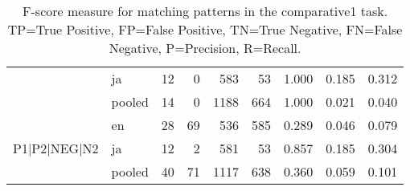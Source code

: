 \begin{table}[h!]
\begin{tabular}{llrrrrrrr}
 & ja & 12 & 0 & 583 & 53 & 1.000 & 0.185 & 0.312 \\
 & pooled & 14 & 0 & 1188 & 664 & 1.000 & 0.021 & 0.040 \\
\cline{1-9}
\multirow[t]{3}{*}{P1|P2|NEG|N2} & en & 28 & 69 & 536 & 585 & 0.289 & 0.046 & 0.079 \\
 & ja & 12 & 2 & 581 & 53 & 0.857 & 0.185 & 0.304 \\
 & pooled & 40 & 71 & 1117 & 638 & 0.360 & 0.059 & 0.101 \\
\cline{1-9}
\bottomrule
\end{tabular}
\caption{F-score measure for matching patterns in the comparative1 task. TP=True Positive, FP=False Positive, TN=True Negative, FN=False Negative, P=Precision, R=Recall.}
\label{tab:comparative1_f1}
\end{table}
